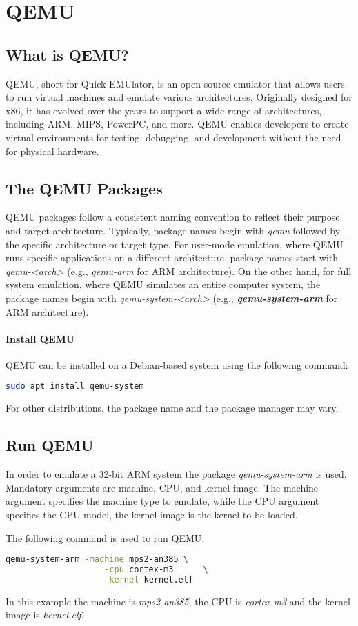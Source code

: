 \section{QEMU}
\subsection{What is QEMU?}
QEMU, short for Quick EMUlator, is an open-source emulator that allows users to run virtual machines and emulate various architectures. Originally designed for x86, it has evolved over the years to support a wide range of architectures, including ARM, MIPS, PowerPC, and more. QEMU enables developers to create virtual environments for testing, debugging, and development without the need for physical hardware.

\subsection{The QEMU Packages}
QEMU packages follow a consistent naming convention to reflect their purpose and target architecture. Typically, package names begin with \textit{qemu} followed by the specific architecture or target type. For user-mode emulation, where QEMU runs specific applications on a different architecture, package names start with \textit{qemu-<arch>} (e.g., \textit{qemu-arm} for ARM architecture). On the other hand, for full system emulation, where QEMU simulates an entire computer system, the package names begin with \textit{qemu-system-<arch>} (e.g., \textit{\textbf{qemu-system-arm}} for ARM architecture).

\paragraph{Install QEMU}
QEMU can be installed on a Debian-based system using the following command:
\begin{lstlisting}[language=bash]
    sudo apt install qemu-system
\end{lstlisting}
For other distributions, the package name and the package manager may vary.

\subsection{Run QEMU}
In order to emulate a 32-bit ARM system the package \textit{qemu-system-arm} is used. Mandatory arguments are machine, CPU, and kernel image. The machine argument specifies the machine type to emulate, while the CPU argument specifies the CPU model, the kernel image is the kernel to be loaded.

\vspace{\baselineskip}

The following command is used to run QEMU:
\begin{lstlisting}[language=bash]
    qemu-system-arm -machine mps2-an385 \
                    -cpu cortex-m3      \
                    -kernel kernel.elf
\end{lstlisting}

In this example the machine is \textit{mps2-an385}, the CPU is \textit{cortex-m3} and the kernel image is \textit{kernel.elf}.